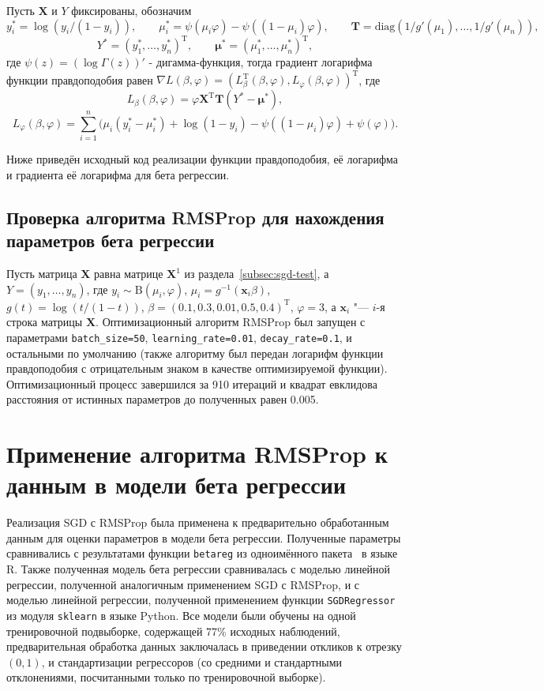 \documentclass{article}
\begin{document}
Пусть $\mathbf{X}$ и $Y$ фиксированы, обозначим
\[
  y_i^* = \log(y_i / (1 - y_i)), \qquad \mu_i^*=\psi(\mu_i\varphi) - \psi((1 - \mu_i)\varphi), \qquad
  \mathbf{T} = \mathrm{diag}\left( 1 / g'(\mu_1), \ldots, 1 / g'(\mu_n) \right),
\]
\[
  Y^* = (y_1^*, \ldots, y_n^*)^{\mathrm{T}}, \qquad \boldsymbol{\mu}^* = (\mu_1^*, \ldots, \mu_n^*)^{\mathrm{T}},
\]
где $\psi(z) = (\log\Gamma(z))'$ - дигамма-функция, тогда градиент логарифма функции правдоподобия равен
$\nabla L(\beta, \varphi) = \left( L_{\beta}^{\mathrm{T}}(\beta, \varphi), L_{\varphi}(\beta, \varphi) \right)^{\mathrm{T}}$, где
\[
  L_{\beta}(\beta, \varphi) = \varphi \mathbf{X}^{\mathrm{T}}\mathbf{T}(Y^* - \boldsymbol{\mu^*}),
\]
\[
  L_{\varphi}(\beta, \varphi) = \sum_{i=1}^n
  \big(
    \mu_i(y_i^* - \mu_i^*) + \log(1 - y_i) - \psi((1 - \mu_i)\varphi) + \psi(\varphi)
  \big).
\]

Ниже приведён исходный код реализации функции правдоподобия, её логарифма и градиента её логарифма
для бета регрессии.


\subsection{Проверка алгоритма RMSProp для нахождения параметров бета регрессии}
Пусть матрица $\mathbf{X}$ равна матрице $\mathbf{X}^1$ из раздела~\ref{subsec:sgd-test},
а $Y = (y_1, \ldots, y_n)$, где $y_i \sim \mathrm{B}(\mu_i, \varphi)$,
$\mu_i = g^{-1}(\boldsymbol{x}_i\beta)$, $g(t) = \log(t / (1-t))$,
$\beta = (0.1, 0.3, 0.01, 0.5, 0.4)^{\mathrm{T}}$, $\varphi = 3$, а $\boldsymbol{x}_i$ "--- $i$-я строка
матрицы $\mathbf{X}$.
Оптимизационный алгоритм RMSProp был запущен с параметрами
\verb|batch_size=50|, \verb|learning_rate=0.01|, \verb|decay_rate=0.1|, и остальными по
умолчанию (также алгоритму был передан логарифм функции правдоподобия с отрицательным знаком
в качестве оптимизируемой функции).
Оптимизационный процесс завершился за 910 итераций и квадрат евклидова расстояния от истинных
параметров до полученных равен 0.005.

\section{Применение алгоритма RMSProp к данным в модели бета регрессии}
Реализация SGD с RMSProp была применена к предварительно
обработанным данным для оценки параметров в модели бета регрессии.
Полученные параметры сравнивались с результатами функции \verb|betareg| из
одноимённого пакета~\cite{betareg-pack} в языке R.
Также полученная модель бета регрессии сравнивалась с моделью линейной регрессии,
полученной аналогичным применением SGD с RMSProp, и с моделью линейной
регрессии, полученной применением функции \verb|SGDRegressor| из
модуля \verb|sklearn| в языке Python.
Все модели были обучены на одной тренировочной подвыборке, содержащей
77\% исходных наблюдений, предварительная обработка данных заключалась в приведении
откликов к отрезку $(0, 1)$, и стандартизации регрессоров (со средними и стандартными
отклонениями, посчитанными только по тренировочной выборке).
\end{document}
